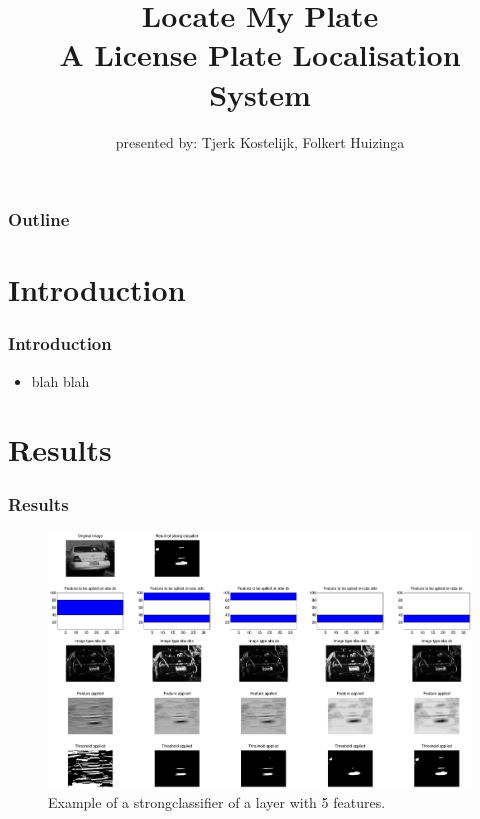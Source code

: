 \documentclass{beamer}
\title{Locate My Plate \\ A License Plate Localisation System}
\subtitle{presented by: Tjerk Kostelijk, Folkert Huizinga}
\date{}
\begin{document}
\frame{\titlepage}

\setcounter{tocdepth}{1}

\frame
{
  \frametitle{Outline}
  \small
  \tableofcontents
  \normalsize
}

\setcounter{tocdepth}{2}

\section{Introduction}
\frame
{
  \frametitle{Introduction}
	
  \begin{itemize}
  \item <+-| alert@+> blah blah 
  \end{itemize}
}

\section{Results}
\frame
{
  \frametitle{Results}
	\begin{figure}[!ht]
	\centering
	\includegraphics[width=18cm]{../report/img/strongClassifier_layer2_img14}
	\caption{Example of a strongclassifier of a layer with 5 features.}
	\label{fig:strongclassify}
	\end{figure}
}

\end{document}
